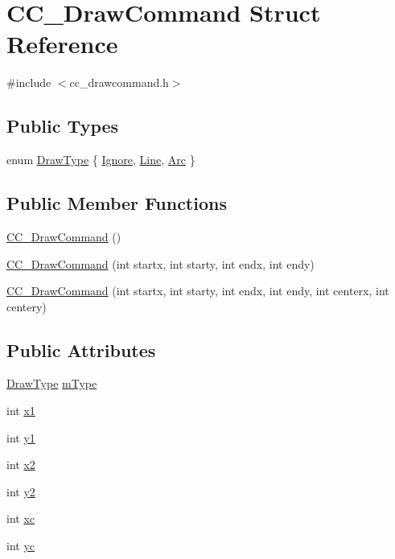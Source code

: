 \hypertarget{a00031}{\section{C\-C\-\_\-\-Draw\-Command Struct Reference}
\label{a00031}
}


{\ttfamily \#include $<$cc\-\_\-drawcommand.\-h$>$}

\subsection*{Public Types}
\begin{DoxyCompactItemize}
\item 
enum \hyperlink{a00031_a09d878e8c72b1df192ba53dd29faa65f}{Draw\-Type} \{ \hyperlink{a00031_a09d878e8c72b1df192ba53dd29faa65fa9bfaccd09375a8911e5e81e436bc7820}{Ignore}, 
\hyperlink{a00031_a09d878e8c72b1df192ba53dd29faa65fa99e1febda720b708293dfed01566d2c5}{Line}, 
\hyperlink{a00031_a09d878e8c72b1df192ba53dd29faa65fa4b2c823d50e2529572a11fac86b117f3}{Arc}
 \}
\end{DoxyCompactItemize}
\subsection*{Public Member Functions}
\begin{DoxyCompactItemize}
\item 
\hyperlink{a00031_ae8e56d436c0238788a914b89052b23ae}{C\-C\-\_\-\-Draw\-Command} ()
\item 
\hyperlink{a00031_ae026fc176d1cd0174dc68c12adc0e68c}{C\-C\-\_\-\-Draw\-Command} (int startx, int starty, int endx, int endy)
\item 
\hyperlink{a00031_ae2008a7ba33eefec103b93f2f45b42af}{C\-C\-\_\-\-Draw\-Command} (int startx, int starty, int endx, int endy, int centerx, int centery)
\end{DoxyCompactItemize}
\subsection*{Public Attributes}
\begin{DoxyCompactItemize}
\item 
\hyperlink{a00031_a09d878e8c72b1df192ba53dd29faa65f}{Draw\-Type} \hyperlink{a00031_a705d7df69bb8d1d57cf19364bb16c360}{m\-Type}
\item 
int \hyperlink{a00031_ab0765ddbef0f8b2a951b1cbf89749dcb}{x1}
\item 
int \hyperlink{a00031_a4f1aa57032b716f3dba3c7db7cc1b696}{y1}
\item 
int \hyperlink{a00031_a51a3822e9c4987fb24b7c1673f4578a1}{x2}
\item 
int \hyperlink{a00031_a22b01120d695ad8298ade1495ad25732}{y2}
\item 
int \hyperlink{a00031_acb50ef1cef70a72abb115119ca846fb6}{xc}
\item 
int \hyperlink{a00031_aa60a4aa36130b9ae6aae267ed96a4d03}{yc}
\end{DoxyCompactItemize}


